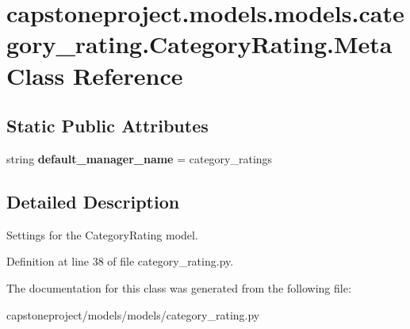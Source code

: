 \hypertarget{classcapstoneproject_1_1models_1_1models_1_1category__rating_1_1_category_rating_1_1_meta}{}\section{capstoneproject.\+models.\+models.\+category\+\_\+rating.\+Category\+Rating.\+Meta Class Reference}
\label{classcapstoneproject_1_1models_1_1models_1_1category__rating_1_1_category_rating_1_1_meta}
\subsection*{Static Public Attributes}
\begin{DoxyCompactItemize}
\item 
\mbox{\label{classcapstoneproject_1_1models_1_1models_1_1category__rating_1_1_category_rating_1_1_meta_ad41e5b0f7457ff7e9e487da009e07282}} 
string {\bfseries default\+\_\+manager\+\_\+name} = \textquotesingle{}category\+\_\+ratings\textquotesingle{}
\end{DoxyCompactItemize}


\subsection{Detailed Description}
\begin{DoxyVerb}Settings for the CategoryRating model.\end{DoxyVerb}
 

Definition at line 38 of file category\+\_\+rating.\+py.



The documentation for this class was generated from the following file\+:\begin{DoxyCompactItemize}
\item 
capstoneproject/models/models/category\+\_\+rating.\+py\end{DoxyCompactItemize}
